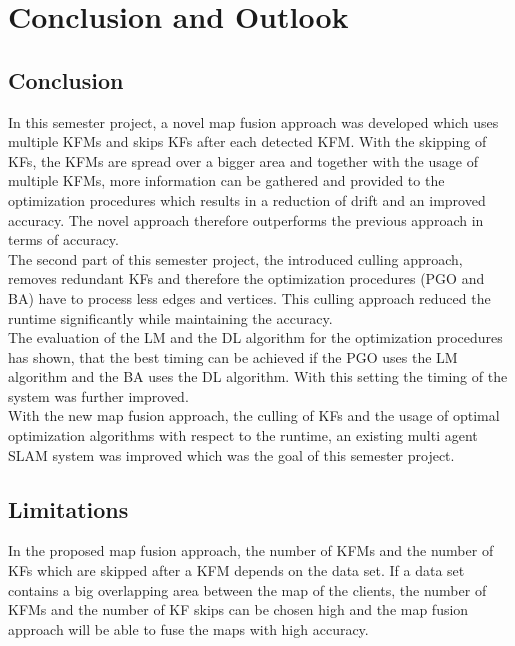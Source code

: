 \chapter{Conclusion and Outlook}

\section{Conclusion}
In this semester project, a novel map fusion approach was developed which uses multiple \acp{KFM} and skips \acp{KF} after each detected \ac{KFM}. With the skipping of \acp{KF}, the \acp{KFM} are spread over a bigger area and together with the usage of multiple \acp{KFM}, more information can be gathered and provided to the optimization procedures which results in a reduction of drift and an improved accuracy. The novel approach therefore outperforms the previous approach in terms of accuracy.\\

The second part of this semester project, the introduced culling approach, removes redundant \acp{KF} and therefore the optimization procedures (\ac{PGO} and \ac{BA}) have to process less edges and vertices. This culling approach reduced the runtime significantly while maintaining the accuracy.\\

The evaluation of the \ac{LM} and the \ac{DL} algorithm for the optimization procedures has shown, that the best timing can be achieved if the \ac{PGO} uses the \ac{LM} algorithm and the \ac{BA} uses the \ac{DL} algorithm. With this setting the timing of the system was further improved.\\

With the new map fusion approach, the culling of \acp{KF} and the usage of optimal optimization algorithms with respect to the runtime, an existing multi agent \ac{SLAM} system was improved which was the goal of this semester project.

\section{Limitations}
In the proposed map fusion approach, the number of \acp{KFM} and the number of \acp{KF} which are skipped after a \ac{KFM} depends on the data set. If a data set contains a big overlapping area between the map of the clients, the number of \acp{KFM} and the number of \ac{KF} skips can be chosen high and the map fusion approach will be able to fuse the maps with high accuracy.\\

